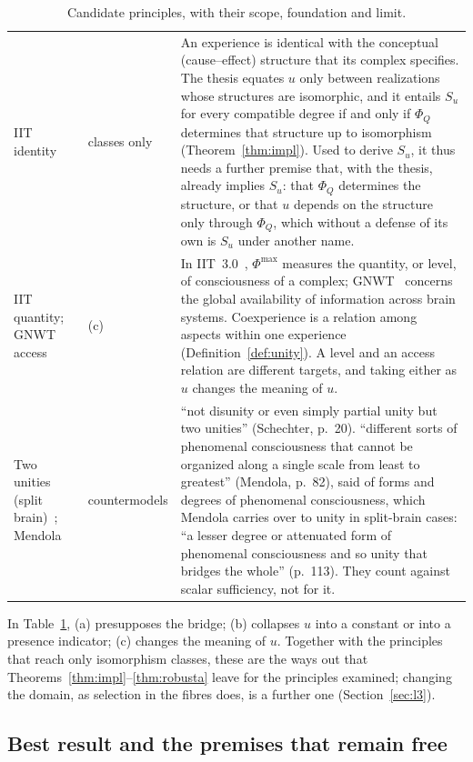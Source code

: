 \begin{table}[htbp]
\begin{tabular}{>{\raggedright\arraybackslash}p{}>{\raggedright\arraybackslash}p{}>{\raggedright\arraybackslash}p{}}
IIT identity~\cite{Oizumi2014} & classes only & An experience is identical with the conceptual (cause--effect) structure that its complex specifies. The thesis equates $u$ only between realizations whose structures are isomorphic, and it entails $S_u$ for every compatible degree if and only if $\Phi_Q$ determines that structure up to isomorphism (Theorem~\ref{thm:impl}). Used to derive $S_u$, it thus needs a further premise that, with the thesis, already implies $S_u$: that $\Phi_Q$ determines the structure, or that $u$ depends on the structure only through $\Phi_Q$, which without a defense of its own is $S_u$ under another name.\\
IIT quantity; GNWT access & (c) & In IIT~3.0~\cite{Oizumi2014}, $\Phi^{\max}$ measures the quantity, or level, of consciousness of a complex; GNWT~\cite{DehaeneChangeux2011} concerns the global availability of information across brain systems. Coexperience is a relation among aspects within one experience (Definition~\ref{def:unity}). A level and an access relation are different targets, and taking either as $u$ changes the meaning of $u$.\\
Two unities (split brain)~\cite{Schechter2018}; Mendola~\cite{Mendola2025} & countermodels & ``not disunity or even simply partial unity but two unities'' (Schechter, p.~20). ``different sorts of phenomenal consciousness that cannot be organized along a single scale from least to greatest'' (Mendola, p.~82), said of forms and degrees of phenomenal consciousness, which Mendola carries over to unity in split-brain cases: ``a lesser degree or attenuated form of phenomenal consciousness and so unity that bridges the whole'' (p.~113). They count against scalar sufficiency, not for it.\\
\bottomrule
\end{tabular}
\caption{Candidate principles, with their scope, foundation and limit.}\label{tab:B-1}
\end{table}

In Table~\ref{tab:B-1}, (a) presupposes the bridge; (b) collapses $u$ into a constant or into a presence indicator; (c) changes the meaning of $u$. Together with the principles that reach only isomorphism classes, these are the ways out that Theorems~\ref{thm:impl}--\ref{thm:robusta} leave for the principles examined; changing the domain, as selection in the fibres does, is a further one (Section~\ref{sec:l3}).

\subsection{Best result and the premises that remain free}\label{sec:mejor}

